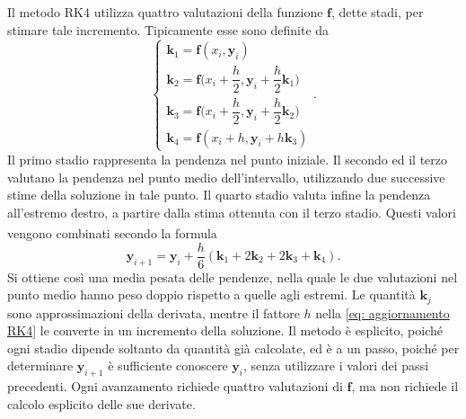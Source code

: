 \documentclass{article}
\newcommand{\supcite}[2][]{\textsuperscript{\cite[#1]{#2}}}
\numberwithin{equation}{section}
\begin{document}
Il metodo RK4 utilizza quattro valutazioni della funzione $\bm{f}$, dette stadi, per stimare tale incremento. Tipicamente esse sono definite da
\begin{equation}
\label{eq: stadi RK4}
    \begin{cases}
        \bm{k}_1 = \bm{f}(x_i,\bm{y}_i) \\[2ex]
        \bm{k}_2 = \bm{f}\bigg(x_i+\dfrac{h}{2}, \bm{y}_i+\dfrac{h}{2}\bm{k}_1\bigg) \\[2ex]
        \bm{k}_3 = \bm{f}\bigg(x_i+\dfrac{h}{2}, \bm{y}_i+\dfrac{h}{2}\bm{k}_2\bigg) \\[2ex]
        \bm{k}_4 = \bm{f}(x_i+h, \bm{y}_i+h\bm{k}_3)
    \end{cases}.
\end{equation}
Il primo stadio rappresenta la pendenza nel punto iniziale. Il secondo ed il terzo valutano la pendenza nel punto medio dell'intervallo, utilizzando due successive stime della soluzione in tale punto. Il quarto stadio valuta infine la pendenza all'estremo destro, a partire dalla stima ottenuta con il terzo stadio. Questi valori vengono combinati secondo la formula\supcite[pgg.~710--711]{press1992}
\begin{equation}
\label{eq: aggiornamento RK4}
    \bm{y}_{i+1} = \bm{y}_i
    + \frac{h}{6}\left(\bm{k}_1+2\bm{k}_2
    +2\bm{k}_3+\bm{k}_4\right).
\end{equation}
Si ottiene così una media pesata delle pendenze, nella quale le due valutazioni nel punto medio hanno peso doppio rispetto a quelle agli estremi. Le quantità $\bm{k}_j$ sono approssimazioni della derivata, mentre il fattore $h$ nella \eqref{eq: aggiornamento RK4} le converte in un incremento della soluzione. Il metodo è esplicito, poiché ogni stadio dipende soltanto da quantità già calcolate, ed è a un passo, poiché per determinare $\bm{y}_{i+1}$ è sufficiente conoscere $\bm{y}_i$, senza utilizzare i valori dei passi precedenti. Ogni avanzamento richiede quattro valutazioni di $\bm{f}$, ma non richiede il calcolo esplicito delle sue derivate.
\end{document}
